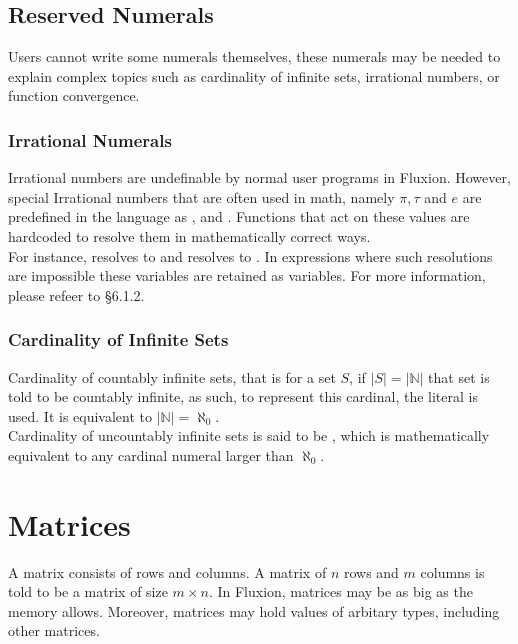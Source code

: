 \documentclass[11pt,a4paper]{book}
\begin{document}
\subsection{Reserved Numerals}

Users cannot write some numerals themselves, these numerals may be needed to explain complex topics such as cardinality of infinite sets, irrational numbers, or function convergence.

\subsubsection{Irrational Numerals}
Irrational numbers are undefinable by normal user programs in Fluxion. However, special Irrational numbers that are often used in math, namely $\pi, \tau$ and $e$ are predefined in the language as ,  and . Functions that act on these values are hardcoded to resolve them in mathematically correct ways.\\

For instance,  resolves to  and  resolves to . In expressions where such resolutions are impossible these variables are retained as variables. For more information, please refeer to \S 6.1.2.

\subsubsection{Cardinality of Infinite Sets}

Cardinality of countably infinite sets, that is for a set $S$, if $|S| = |\mathbb{N}|$ that set is told to be countably infinite, as such, to represent this cardinal, the literal  is used. It is equivalent to $|\mathbb{N}| = \aleph_0$. \\

Cardinality of uncountably infinite sets is said to be , which is mathematically equivalent to any cardinal numeral larger than $\aleph_0$.

\section{Matrices}

A matrix consists of rows and columns. A matrix of $n$ rows and $m$ columns is told to be a matrix of size $m \times n$. In Fluxion, matrices may be as big as the memory allows. Moreover, matrices may hold values of arbitary types, including other matrices.
\end{document}
